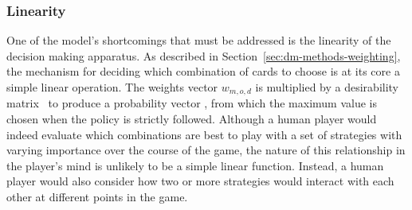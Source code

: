 
\subsubsection*{Linearity}
\label{sec:disc-shortcomings-linearity}


One of the model's shortcomings that must be addressed is the linearity
of the decision making apparatus.
%
As described in Section~\ref{sec:dm-methods-weighting},
the mechanism for deciding which combination of cards to choose is\textemdash
at its core\textemdash
a simple linear operation.
%
The weights vector $w_{m,o,d}$ is multiplied by a desirability matrix \Smat\
to produce a probability vector \pvec,
from which the maximum value is chosen when the policy is strictly followed.
%
Although a human player would indeed evaluate which combinations are best
to play with a set of strategies with varying importance over the course
of the game,
the nature of this relationship in the player's mind is unlikely
to be a simple linear function.
%
Instead,
a human player would also consider how two or more strategies would interact
with each other at different points in the game.

